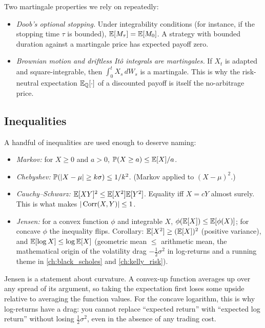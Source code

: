 Two martingale properties we rely on repeatedly:
\begin{itemize}
  \item \emph{Doob's optional stopping.} Under integrability
        conditions (for instance, if the stopping time $\tau$ is
        bounded), $\mathbb{E}[M_\tau] = \mathbb{E}[M_0]$. A strategy with bounded
        duration against a martingale price has expected payoff zero.
  \item \emph{Brownian motion and driftless It\^o integrals are
        martingales.} If $X_t$ is adapted and square-integrable, then
        $\int_0^t X_s\, dW_s$ is a martingale. This is why the
        risk-neutral expectation $\mathbb{E}_{\mathbb{Q}}[\cdot]$ of a discounted payoff
        is itself the no-arbitrage price.
\end{itemize}

\subsection{Inequalities}

A handful of inequalities are used enough to deserve naming:
\begin{itemize}
  \item \emph{Markov:} for $X \ge 0$ and $a > 0$,
        $\mathbb{P}(X \ge a) \le \mathbb{E}[X]/a$.
  \item \emph{Chebyshev:} $\mathbb{P}(|X - \mu| \ge k\sigma) \le 1/k^2$.
        (Markov applied to $(X - \mu)^2$.)
  \item \emph{Cauchy--Schwarz:} $\mathbb{E}[XY]^2 \le \mathbb{E}[X^2]\mathbb{E}[Y^2]$. Equality
        iff $X = cY$ almost surely. This is what makes
        $|\operatorname{Corr}(X,Y)| \le 1$.
  \item \emph{Jensen:} for a convex function $\phi$ and integrable $X$,
        $\phi(\mathbb{E}[X]) \le \mathbb{E}[\phi(X)]$; for concave $\phi$ the inequality
        flips. Corollary: $\mathbb{E}[X^2] \ge (\mathbb{E}[X])^2$ (positive variance),
        and $\mathbb{E}[\log X] \le \log \mathbb{E}[X]$ (geometric mean $\le$
        arithmetic mean, the mathematical origin of the volatility
        drag $-\tfrac{1}{2}\sigma^2$ in log-returns and a running
        theme in \cref{ch:black_scholes} and \cref{ch:kelly_risk}).
\end{itemize}

\begin{intuitionbox}
Jensen is a statement about curvature. A convex-up function averages up
over any spread of its argument, so taking the expectation first loses
some upside relative to averaging the function values. For the
concave logarithm, this is why log-returns have a drag: you cannot
replace ``expected return'' with ``expected log return'' without losing
$\tfrac{1}{2}\sigma^2$, even in the absence of any trading cost.
\end{intuitionbox}

